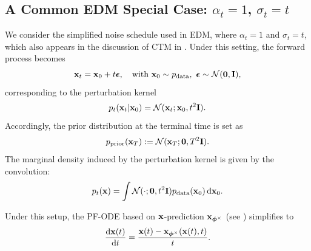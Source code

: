 \subsection{A Common EDM Special Case: $\alpha_t = 1$, $\sigma_t = t$}

We consider the simplified noise schedule used in EDM, where $\alpha_t = 1$ and $\sigma_t = t$, which also appears in the discussion of CTM in . Under this setting, the forward process becomes
\[
{\mathbf{x}}_t = {\mathbf{x}}_0 + t\bm{\epsilon}, \quad \text{with } {\mathbf{x}}_0 \sim p_{\text{data}}, \,\, \bm{\epsilon} \sim \mathcal{N}(\bm{0}, {\mathbf{I}}),
\]
corresponding to the perturbation kernel
\[
p_t({\mathbf{x}}_t|{\mathbf{x}}_0) = \mathcal{N}({\mathbf{x}}_t; {\mathbf{x}}_0, t^2{\mathbf{I}}).
\]
Accordingly, the prior distribution at the terminal time is set as
\[
p_{\text{prior}}({\mathbf{x}}_T) := \mathcal{N}({\mathbf{x}}_T; \bm{0}, T^2 {\mathbf{I}}).
\]
The marginal density induced by the perturbation kernel is given by the convolution:
\begin{align*}
    p_t({\mathbf{x}}) = \int \mathcal{N}(\cdot; \bm{0}, t^2 {\mathbf{I}})p_{\text{data}}({\mathbf{x}}_0)\mathop{}\!\mathrm{d} {\mathbf{x}}_0.
\end{align*}

Under this setup, the PF-ODE based on ${\mathbf{x}}$-prediction ${\mathbf{x}}_{\bm{\phi}^\times}$ (see ) simplifies to
\begin{align*}
    \frac{\mathop{}\!\mathrm{d} {\mathbf{x}}(t)}{\mathop{}\!\mathrm{d} t} = \frac{{\mathbf{x}}(t) - {\mathbf{x}}_{\bm{\phi}^\times}({\mathbf{x}}(t), t)}{t}.
\end{align*}

